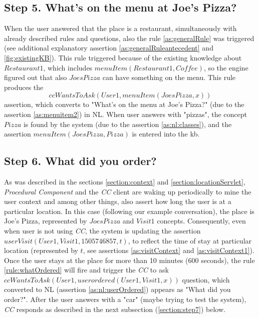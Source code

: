 \subsection{Step 5. What's on the menu at Joe's Pizza?}
\label{section:step5}
When the user answered that the place is a restaurant, simultaneously with
already described rules and questions, also the rule \ref{as:generalRule} was
triggered (see additional explanatory assertion \ref{as:generalRuleantecedent}
and \ref{fig:existingKB}). This rule triggered  
because of the existing knowledge about $Restaurant1$, which includes 
$menuItem(Restaurant1,Coffee)$, so the engine figured out that also $JoesPizza$
can have something on the menu. This rule produces the
\begin{equation*}
	ccWantsToAsk(User1,menuItem(JoesPizza,x))
\end{equation*}
assertion, which converts to "What's on the menu at Joe's 
Pizza?" (due to the assertion \ref{as:menuitem2}) in NL. When user answers with
"pizzas", the concept $Pizza$ is found by the system (due to the assertion
\ref{as:nl:classes}), and the assertion $menuItem(JoesPizza,Pizza)$ is entered into the 
kb. 

\subsection{Step 6. What did you order?}
\label{section:step6}
As was described in the sections \ref{section:context} and 
\ref{section:locationServlet}, \emph{Procedural Component} and the \emph{CC} 
client are  waking up periodically to mine the user context and among other 
things, also assert how long the user is at a particular location. In this case
(following our example conversation), the place is Joe's Pizza, represented
by $JoesPizza$ and $Visit1$ concepts. Consequently, even when user is not
using \emph{CC}, the system is updating the assertion 
$userVisit(User1,Visit1,1505746857, t)$, to reflect the time of stay at 
particular location (represented by $t$, see assertions \ref{as:visitContext} 
and \ref{as:visitContext1}). Once the user stays at the place for more than
10 minutes (600 seconds), the rule \ref{rule:whatOrdered} will fire and 
trigger the \emph{CC} to ask $ccWantsToAsk(User1,userordered(User1,Visit1,x))$
question, which converted to NL (assertion \ref{as:nl:userOrdered}) appears as 
"What did you order?". After the user answers with a "car" (maybe trying to 
test the system), \emph{CC} responds as described in the next subsection 
(\autoref{section:step7}) below.

